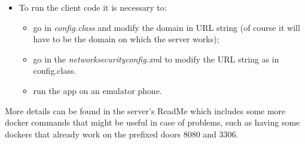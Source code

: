 \begin{itemize}
	\item To run the client code it is necessary to:
		\begin{itemize}
			\item go in \textit{config.class} and modify the domain in URL string (of course it will have to be the domain on 					which the server works);
			\item go in the \textit{networksecurityconfig.xm}l to modify the URL string as in config.class.
			\item run the app on an emulator phone.
		\end{itemize} 
\end{itemize}
More details can be found in the server's ReadMe which includes some more docker commands that might be useful in case of problems, such as having some dockers that already work on the prefixed doors 8080 and 3306.


